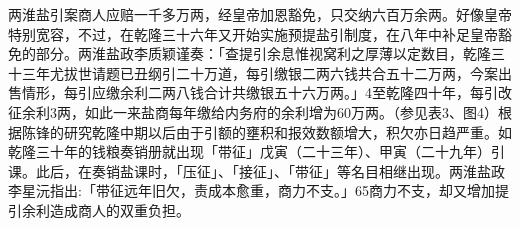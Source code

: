 

两淮盐引案商人应赔一千多万两，经皇帝加恩豁免，只交纳六百万余两。好像皇帝特别宽容，不过，在乾隆三十六年又开始实施预提盐引制度，在八年中补足皇帝豁免的部分。两淮盐政李质颖谨奏：「查提引余息惟视窝利之厚薄以定数目，乾隆三十三年尤拔世请题已丑纲引二十万道，每引缴银二两六钱共合五十二万两，今案出售情形，每引应缴余利二两八钱合计共缴银五十六万两。」4至乾隆四十年，每引改征余利3两，如此一来盐商每年缴给内务府的余利增为60万两。（参见表3、图4）根据陈锋的研究乾隆中期以后由于引额的壅积和报效数额增大，积欠亦日趋严重。如乾隆三十年的钱粮奏销册就出现「带征」戊寅（二十三年）、甲寅（二十九年）引课。此后，在奏销盐课时，「压征」、「接征」、「带征」等名目相继出现。两淮盐政李星沅指出:「带征远年旧欠，责成本愈重，商力不支。」65商力不支，却又增加提引余利造成商人的双重负担。


\vfill
\begin{BookNotes}
\end{BookNotes}


